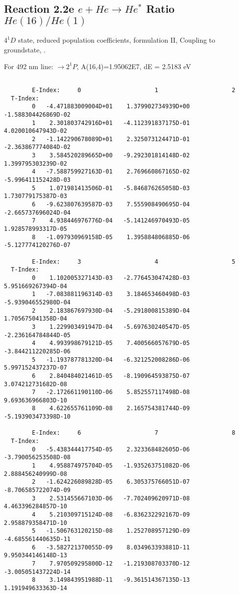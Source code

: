 \documentclass[12pt,dvipdfmx]{article}
\begin{document}
{\subsection{
  Reaction 2.2e $e + He \rightarrow He^*  $ Ratio $He(16)/He(1)$
}

  $4^1D$ state,
  reduced population coefficients, formulation II,
  Coupling to groundstate, \cite{kn:Fujimoto} .

  For 492 nm line: $\rightarrow 2^1P$, A(16,4)=1.95062E7, dE = 2.5183 eV

\begin{small}\begin{verbatim}

        E-Index:     0                     1                     2
  T-Index:
        0   -4.471883009004D+01    1.379902734939D+00   -1.588304426869D-02
        1    2.301803742916D+01   -4.112391837175D-01    4.020010647943D-02
        2   -1.142290678089D+01    2.325073124471D-01   -2.363867774084D-02
        3    3.584520289665D+00   -9.292301814148D-02    1.399795303239D-02
        4   -7.588759927163D-01    2.769660867165D-02   -5.996411152428D-03
        5    1.071981413506D-01   -5.846876265058D-03    1.730779175387D-03
        6   -9.623807639587D-03    7.555908490695D-04   -2.665737696024D-04
        7    4.938446976776D-04   -5.141246970493D-05    1.928578993317D-05
        8   -1.097930969158D-05    1.395884806885D-06   -5.127774120276D-07

        E-Index:     3                     4                     5
  T-Index:
        0    1.102005327143D-03   -2.776453047428D-03    5.951669267394D-04
        1   -7.083881196314D-03    3.184653460498D-03   -5.939046552980D-04
        2    2.183867697930D-04   -5.291800815389D-04    1.705675041358D-04
        3    1.229903491947D-04   -5.697630240547D-05   -2.236164784844D-05
        4    4.993998679121D-05    7.400566057679D-05   -3.844211220285D-06
        5   -1.193787781320D-04   -6.321252008286D-06    5.997152437237D-07
        6    2.840484021461D-05   -8.190964593875D-07    3.074212731682D-08
        7   -2.172661190110D-06    5.852557117498D-08    9.693636966803D-10
        8    4.622655761109D-08    2.165754381744D-09   -5.193903473398D-10

        E-Index:     6                     7                     8
  T-Index:
        0   -5.438344417754D-05    2.323368482605D-06   -3.790056253508D-08
        1    4.958874975704D-05   -1.935263751082D-06    2.888456240999D-08
        2   -1.624226089828D-05    6.305375766051D-07   -8.706585722074D-09
        3    2.531455667103D-06   -7.702409620971D-08    4.463396284857D-10
        4    5.210309715124D-08   -6.836232292167D-09    2.958879358471D-10
        5   -1.506763120215D-08    1.252708957129D-09   -4.685561440635D-11
        6   -3.582721370055D-09    8.034963393881D-11    9.950344146148D-13
        7    7.970509295800D-12   -1.219308703370D-12   -3.005051437224D-14
        8    3.149843951988D-11   -9.361514367135D-13    1.191949633363D-14


\end{verbatim}
\end{small}}
\end{document}
